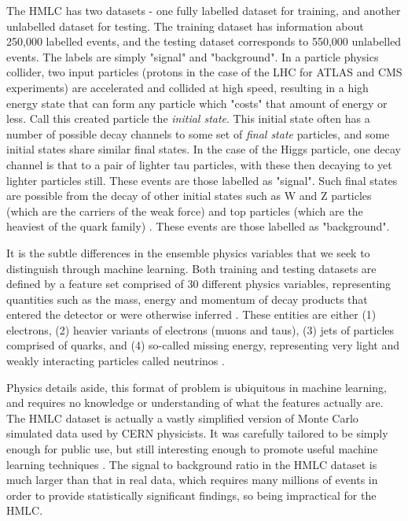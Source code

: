 \documentclass          {article} %
\begin{document}
The HMLC has two datasets - one fully labelled dataset for training, and another unlabelled dataset for testing. The training dataset has information about 250,000 labelled events, and the testing dataset corresponds to 550,000 unlabelled events. The labels are simply "signal" and "background". In a particle physics collider, two input particles (protons in the case of the LHC for ATLAS and CMS experiments) are accelerated and collided at high speed, resulting in a high energy state that can form any particle which "costs" that amount of energy or less. Call this created particle the \textit{initial state}. This initial state often has a number of possible decay channels to some set of \textit{final state} particles, and some initial states share similar final states. In the case of the Higgs particle, one decay channel is that to a pair of lighter tau particles, with these then decaying to yet lighter particles still. These events are those labelled as "signal". Such final states are possible from the decay of other initial states such as W and Z particles (which are the carriers of the weak force) and top particles (which are the heaviest of the quark family) \cite{Rousseau2015}. These events are those labelled as "background".

It is the subtle differences in the ensemble physics variables that we seek to distinguish through machine learning. Both training and testing datasets are defined by a feature set comprised of 30 different physics variables, representing quantities such as the mass, energy and momentum of decay products that entered the detector or were otherwise inferred \cite{Rousseau2015, Chen2015}. These entities are either (1) electrons, (2) heavier variants of electrons (muons and taus), (3) jets of particles comprised of quarks, and (4) so-called missing energy, representing very light and weakly interacting particles called neutrinos \cite{Chen2015}.

Physics details aside, this format of problem is ubiquitous in machine learning, and requires no knowledge or understanding of what the features actually are. The HMLC dataset is actually a vastly simplified version of Monte Carlo simulated data used by CERN physicists. It was carefully tailored to be simply enough for public use, but still interesting enough to promote useful machine learning techniques \cite{Rousseau2015}. The signal to background ratio in the HMLC dataset is much larger than that in real data, which requires many millions of events in order to provide statistically significant findings, so being impractical for the HMLC.
\end{document}
